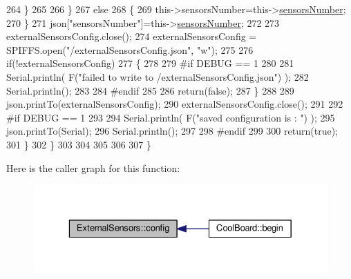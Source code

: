 \begin{DoxyCode}
264                 \}
265  
266             \}
267             \textcolor{keywordflow}{else}
268             \{
269                 this->sensorsNumber=this->\hyperlink{class_external_sensors_a58e4fbf9adeae787d92be5fa33043b5d}{sensorsNumber};
270             \}
271             json[\textcolor{stringliteral}{"sensorsNumber"}]=this->\hyperlink{class_external_sensors_a58e4fbf9adeae787d92be5fa33043b5d}{sensorsNumber};
272 
273             externalSensorsConfig.close();
274             externalSensorsConfig = SPIFFS.open(\textcolor{stringliteral}{"/externalSensorsConfig.json"}, \textcolor{stringliteral}{"w"});
275 
276             \textcolor{keywordflow}{if}(!externalSensorsConfig)
277             \{
278             
279 \textcolor{preprocessor}{            #if DEBUG == 1 }
280 
281                 Serial.println( F(\textcolor{stringliteral}{"failed to write to /externalSensorsConfig.json"}) );
282                 Serial.println();
283             
284 \textcolor{preprocessor}{            #endif}
285 
286                 \textcolor{keywordflow}{return}(\textcolor{keyword}{false});
287             \}
288             
289             json.printTo(externalSensorsConfig);
290             externalSensorsConfig.close();
291             
292 \textcolor{preprocessor}{        #if DEBUG == 1 }
293 
294             Serial.println( F(\textcolor{stringliteral}{"saved configuration is : "}) );
295             json.printTo(Serial);
296             Serial.println();
297         
298 \textcolor{preprocessor}{        #endif}
299 
300             \textcolor{keywordflow}{return}(\textcolor{keyword}{true}); 
301         \}
302     \}   
303     
304 
305 
306 
307 \}
\end{DoxyCode}
Here is the caller graph for this function\+:\nopagebreak
\begin{figure}[H]
\begin{center}
\leavevmode
\includegraphics[width=329pt]{d1/d2f/class_external_sensors_a862a4bd11346b37270d0244c2adabe5a_icgraph}
\end{center}
\end{figure}
\mbox{\label{class_external_sensors_ac829858f587e15a3fcb00567248f0edd}} 
